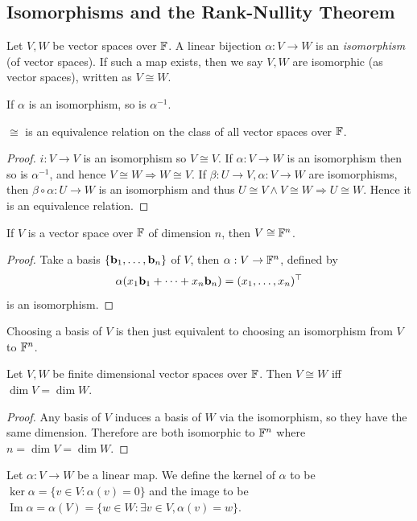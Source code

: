 \documentclass[a4paper]{article}
\begin{document}
\subsection{Isomorphisms and the Rank-Nullity Theorem}
\begin{definition}
    Let $V,W$ be vector spaces over ${\mathbb{F}}$.
    A linear bijection $\alpha:V\to W$ is an \textit{isomorphism} (of vector spaces).
    If such a map exists, then we say $V,W$ are isomorphic (as vector spaces), written as $V\cong W$.
\end{definition}
\begin{remark}
    If $\alpha$ is an isomorphism, so is $\alpha^{-1}$.
\end{remark}
\begin{lemma}
    $\cong$ is an equivalence relation on the class of all vector spaces over ${\mathbb{F}}$.
\end{lemma}
\begin{proof}
    $i:V\to V$ is an isomorphism so $ V \cong V $. If $ \alpha:V\to W $ is an isomorphism then so is $ \alpha^{-1} $, and hence $ V \cong W \Rightarrow W \cong V $. If $ \beta:U\to V,\alpha:V\to W $ are isomorphisms, then $ \beta\circ \alpha:U\to W $ is an isomorphism and thus $ U \cong V \land V \cong W \Rightarrow U \cong W $. Hence it is an equivalence relation.
\end{proof}
\begin{theorem}
    If $V$ is a vector space over ${\mathbb{F}}$ of dimension $n$, then $V\cong {\mathbb{F}}^n$.
\end{theorem}
\begin{proof}
    Take a basis $\{{\bf b}_1,\ldots,{\bf b}_n\}$ of $V$, then $ \alpha:V\to {\mathbb{F}}^n $, defined by
    $$\alpha(x_1{\bf b}_1+\cdots+x_n{\bf b}_n)=(x_1,\ldots,x_n)^\top$$
    is an isomorphism.
\end{proof}
\begin{remark}
    Choosing a basis of $V$ is then just equivalent to choosing an isomorphism from $V$ to ${\mathbb{F}}^n$.
\end{remark}
\begin{theorem}
    Let $V,W$ be finite dimensional vector spaces over ${\mathbb{F}}$.
    Then $V\cong W$ iff $\dim V=\dim W$.
\end{theorem}
\begin{proof}
    Any basis of $V$ induces a basis of $W$ via the isomorphism, so they have the same dimension.
    Therefore are both isomorphic to ${\mathbb{F}}^n$ where $n=\dim V=\dim W$.
\end{proof}
\begin{definition}
    Let $\alpha:V\to W$ be a linear map.
    We define the kernel of $\alpha$ to be $\ker\alpha=\{v\in V:\alpha(v)=0\}$ and the image to be $\operatorname{Im}\alpha=\alpha(V)=\{w\in W:\exists v\in V,\alpha(v)=w\}$.
\end{definition}
\end{document}

